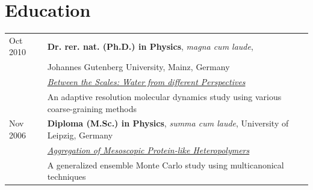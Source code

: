 \documentclass{article}
\begin{document}
\section*{Education}
\begin{tabular}{ll}
Oct 2010& \textbf{Dr. rer. nat. (Ph.D.) in Physics}, \textit{magna cum laude},\\
&Johannes Gutenberg University, Mainz, Germany\\
&\href{http://www.compphys.de/publications/2010e.pdf}{\textit{Between the Scales: Water from different Perspectives}}\\
&An adaptive resolution molecular dynamics study using various coarse-graining methods\\
Nov 2006&\textbf{Diploma (M.Sc.) in Physics}, \textit{summa cum laude}, University of Leipzig, Germany\\
&\href{http://www.compphys.de/publications/2006d.pdf}{\textit{Aggregation of Mesoscopic Protein-like Heteropolymers}}\\
&A generalized ensemble Monte Carlo study using multicanonical techniques\\
\end{tabular}
\end{document}
